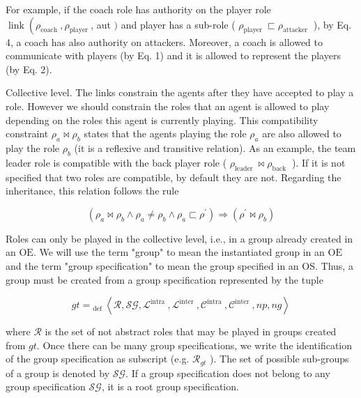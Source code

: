 \documentclass[10pt]{article}
\begin{document}
For example, if the coach role has authority on the player role $\operatorname{link}\left(\rho_{\text {coach }}, \rho_{\text {player }}\right.$, aut $)$ and player has a sub-role ( $\rho_{\text {player }} \sqsubset \rho_{\text {attacker }}$ ), by Eq. 4, a coach has also authority on attackers. Moreover, a coach is allowed to communicate with players (by Eq. 1) and it is allowed to represent the players (by Eq. 2).

Collective level. The links constrain the agents after they have accepted to play a role. However we should constrain the roles that an agent is allowed to play depending on the roles this agent is currently playing. This compatibility constraint $\rho_{a} \bowtie \rho_{b}$ states that the agents playing the role $\rho_{a}$ are also allowed to play the role $\rho_{b}$ (it is a reflexive and transitive relation). As an example, the team leader role is compatible with the back player role ( $\rho_{\text {leader }} \bowtie \rho_{\text {back }}$ ). If it is not specified that two roles are compatible, by default they are not. Regarding the inheritance, this relation follows the rule

$$
\left(\rho_{a} \bowtie \rho_{b} \wedge \rho_{a} \neq \rho_{b} \wedge \rho_{a} \sqsubset \rho^{\prime}\right) \Rightarrow\left(\rho^{\prime} \bowtie \rho_{b}\right)
$$

Roles can only be played in the collective level, i.e., in a group already created in an $\mathrm{OE}$. We will use the term "group" to mean the instantiated group in an $\mathrm{OE}$ and the term "group specification" to mean the group specified in an OS. Thus, a group must be created from a group specification represented by the tuple

$$
g t={ }_{\text {def }}\left\langle\mathcal{R}, \mathcal{S G}, \mathcal{L}^{\text {intra }}, \mathcal{L}^{\text {inter }}, \mathcal{C}^{\text {intra }}, \mathcal{C}^{\text {inter }}, n p, n g\right\rangle
$$

where $\mathcal{R}$ is the set of not abstract roles that may be played in groups created from $g t$. Once there can be many group specifications, we write the identification of the group
specification as subscript (e.g. $\mathcal{R}_{g t}$ ). The set of possible sub-groups of a group is denoted by $\mathcal{S G}$. If a group specification does not belong to any group specification $\mathcal{S G}$, it is a root group specification.
\end{document}
